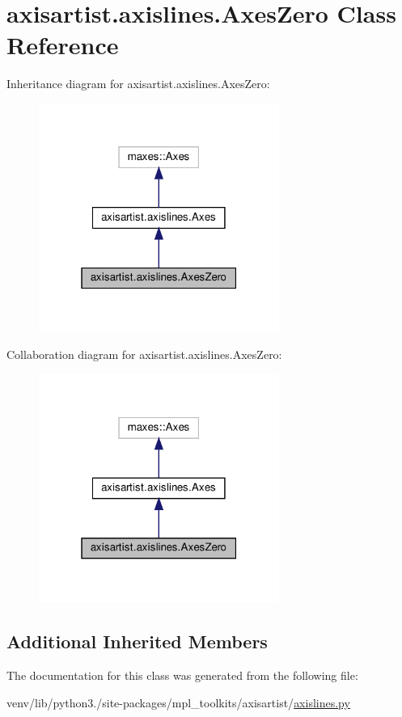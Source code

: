 \hypertarget{classaxisartist_1_1axislines_1_1AxesZero}{}\section{axisartist.\+axislines.\+Axes\+Zero Class Reference}
\label{classaxisartist_1_1axislines_1_1AxesZero}


Inheritance diagram for axisartist.\+axislines.\+Axes\+Zero\+:
\nopagebreak
\begin{figure}[H]
\begin{center}
\leavevmode
\includegraphics[width=223pt]{classaxisartist_1_1axislines_1_1AxesZero__inherit__graph}
\end{center}
\end{figure}


Collaboration diagram for axisartist.\+axislines.\+Axes\+Zero\+:
\nopagebreak
\begin{figure}[H]
\begin{center}
\leavevmode
\includegraphics[width=223pt]{classaxisartist_1_1axislines_1_1AxesZero__coll__graph}
\end{center}
\end{figure}
\subsection*{Additional Inherited Members}


The documentation for this class was generated from the following file\+:\begin{DoxyCompactItemize}
\item 
venv/lib/python3./site-\/packages/mpl\+\_\+toolkits/axisartist/\hyperlink{axisartist_2axislines_8py}{axislines.\+py}\end{DoxyCompactItemize}
